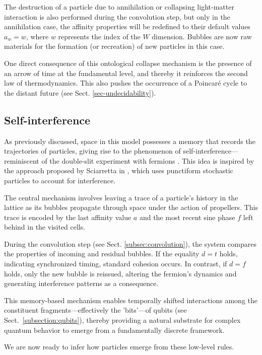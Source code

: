 \documentclass[12pt]{article}
\begin{document}
The destruction of a particle due to annihilation or collapsing light-matter interaction is also performed during the convolution step, but only in the annihilation case, the affinity properties will be redefined to their default values $a_w=w$, where $w$ represents the index of the $W  $ dimension. Bubbles are now raw materials for the formation (or recreation) of new particles in this case.

One direct consequence of this ontological collapse mechanism is the presence of an arrow of time at the fundamental level, and thereby it reinforces the second law of thermodynamics. This also pushes the occurrence of a Poincaré cycle to the distant future (see Sect. \ref{sec-undecidability}).

\subsection{Self-interference\label{subsec:Interference}}

As previously discussed, space in this model possesses a memory that records the trajectories of particles, giving rise to the phenomenon of self-interference—reminiscent of the double-slit experiment with fermions \cite{feynman-2}. This idea is inspired by the approach proposed by Sciarretta in \cite{sciarretta}, which uses punctiform stochastic particles to account for interference.

The central mechanism involves leaving a trace of a particle’s history in the lattice as its bubbles propagate through space under the action of propellers. This trace is encoded by the last affinity value $a$ and the most recent sine phase $f$ left behind in the visited cells.

During the convolution step (see Sect. \ref{subsec:convolution}), the system compares the properties of incoming and residual bubbles. If the equality $d = t$ holds, indicating synchronized timing, standard cohesion occurs. In contrast, if $d=f$ holds, only the new bubble is reissued, altering the fermion’s dynamics and generating interference patterns as a consequence.

This memory-based mechanism enables temporally shifted interactions among the constituent fragments—effectively the 'bits'—of qubits (see Sect.~\ref{subsection:qubits}), thereby providing a natural substrate for complex quantum behavior to emerge from a fundamentally discrete framework.

We are now ready to infer how particles emerge from these low-level rules.
\end{document}
